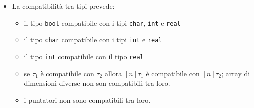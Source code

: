 \documentclass{report}
\newcommand{\term}[1]{\texttt{#1}}
\begin{document}
\begin {itemize}
    \item La compatibilità tra tipi prevede:
    \begin{itemize}
        \item il tipo \term{bool} compatibile con i tipi \term{char}, \term{int} e \term{real}
        \item il tipo \term{char} compatibile con i tipi \term{int} e \term{real}
        \item il tipo \term{int} compatibile con il tipo \term{real}
        \item se $\tau_1$ è compatibile con $\tau_2$ allora $[n]\tau_1$ è compatibile con $[n]\tau_2$;
            array di dimensioni diverse non son compatibili tra loro.
        \item i puntatori non sono compatibili tra loro.

    \end{itemize}


\end{itemize}
\end{document}

